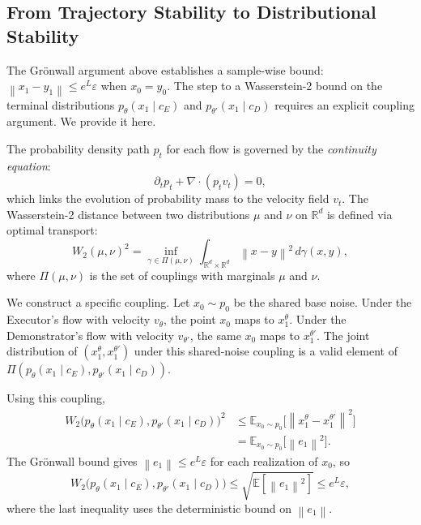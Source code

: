 \documentclass[12pt, a4paper]{article}
\theoremstyle{plain}
\theoremstyle{definition}
\theoremstyle{remark}
\newcommand{\R}{\mathbb{R}}
\newcommand{\norm}[1]{\left\|#1\right\|}
\newcommand{\WTwo}{W_2}
\begin{document}
\subsection{From Trajectory Stability to Distributional Stability}

The Gr\"{o}nwall argument above establishes a sample-wise bound:
$\norm{x_1 - y_1} \leq e^L \varepsilon$ when $x_0 = y_0$. The step to a
Wasserstein-2 bound on the terminal distributions $p_\theta(x_1 \mid c_E)$
and $p_{\theta'}(x_1 \mid c_D)$ requires an explicit coupling argument. We
provide it here.

The probability density path $p_t$ for each flow is governed by the
\emph{continuity equation}:
\begin{equation}
  \partial_t p_t + \nabla \cdot (p_t v_t) = 0,
  \label{eq:continuity}
\end{equation}
which links the evolution of probability mass to the velocity field $v_t$.
The Wasserstein-2 distance between two distributions $\mu$ and $\nu$ on
$\R^d$ is defined via optimal transport:
\begin{equation}
  \WTwo(\mu, \nu)^2 = \inf_{\gamma \in \Pi(\mu,\nu)}
  \int_{\R^d \times \R^d} \norm{x - y}^2 \, d\gamma(x,y),
\end{equation}
where $\Pi(\mu, \nu)$ is the set of couplings with marginals $\mu$ and $\nu$.

We construct a specific coupling. Let $x_0 \sim p_0$ be the shared base
noise. Under the Executor's flow with velocity $v_\theta$, the point $x_0$
maps to $x_1^\theta$. Under the Demonstrator's flow with velocity $v_{\theta'}$,
the same $x_0$ maps to $x_1^{\theta'}$. The joint distribution of
$(x_1^\theta, x_1^{\theta'})$ under this shared-noise coupling is a valid
element of $\Pi(p_\theta(x_1 \mid c_E), p_{\theta'}(x_1 \mid c_D))$.

Using this coupling,
\begin{align}
  \WTwo\bigl(p_\theta(x_1 \mid c_E), p_{\theta'}(x_1 \mid c_D)\bigr)^2
  &\leq \mathbb{E}_{x_0 \sim p_0}\bigl[\norm{x_1^\theta - x_1^{\theta'}}^2\bigr] \\
  &= \mathbb{E}_{x_0 \sim p_0}\bigl[\norm{e_1}^2\bigr].
\end{align}
The Gr\"{o}nwall bound gives $\norm{e_1} \leq e^L \varepsilon$ for each
realization of $x_0$, so
\begin{equation}
  \WTwo\bigl(p_\theta(x_1 \mid c_E), p_{\theta'}(x_1 \mid c_D)\bigr)
  \leq \sqrt{\mathbb{E}[\norm{e_1}^2]}
  \leq e^L \varepsilon,
\end{equation}
where the last inequality uses the deterministic bound on $\norm{e_1}$.
\end{document}
